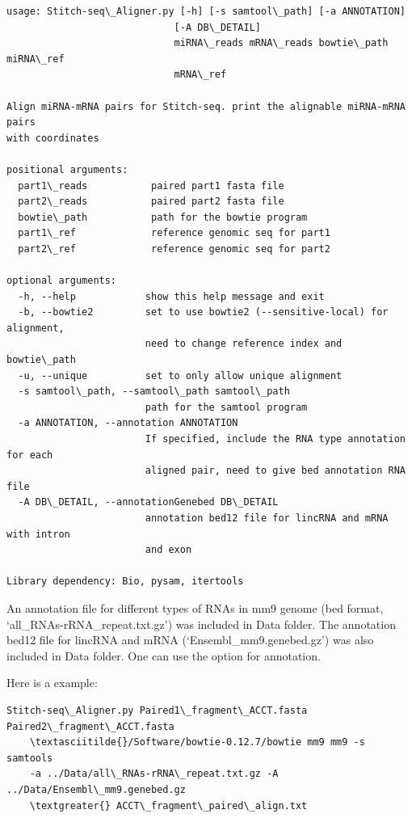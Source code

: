 \documentclass[letterpaper,10pt,english]{sphinxmanual}
\begin{document}
\begin{Verbatim}[commandchars=\\\{\}]
usage: Stitch-seq\_Aligner.py [-h] [-s samtool\_path] [-a ANNOTATION]
                             [-A DB\_DETAIL]
                             miRNA\_reads mRNA\_reads bowtie\_path miRNA\_ref
                             mRNA\_ref

Align miRNA-mRNA pairs for Stitch-seq. print the alignable miRNA-mRNA pairs
with coordinates

positional arguments:
  part1\_reads           paired part1 fasta file
  part2\_reads           paired part2 fasta file
  bowtie\_path           path for the bowtie program
  part1\_ref             reference genomic seq for part1
  part2\_ref             reference genomic seq for part2

optional arguments:
  -h, --help            show this help message and exit
  -b, --bowtie2         set to use bowtie2 (--sensitive-local) for alignment,
                        need to change reference index and bowtie\_path
  -u, --unique          set to only allow unique alignment
  -s samtool\_path, --samtool\_path samtool\_path
                        path for the samtool program
  -a ANNOTATION, --annotation ANNOTATION
                        If specified, include the RNA type annotation for each
                        aligned pair, need to give bed annotation RNA file
  -A DB\_DETAIL, --annotationGenebed DB\_DETAIL
                        annotation bed12 file for lincRNA and mRNA with intron
                        and exon

Library dependency: Bio, pysam, itertools
\end{Verbatim}

An annotation file for different types of RNAs in mm9 genome (bed format, `all\_RNAs-rRNA\_repeat.txt.gz') was included in Data folder. The annotation bed12 file for lincRNA and mRNA (`Ensembl\_mm9.genebed.gz') was also included in Data folder. One can use the option  for annotation.

Here is a example:

\begin{Verbatim}[commandchars=\\\{\}]
Stitch-seq\_Aligner.py Paired1\_fragment\_ACCT.fasta Paired2\_fragment\_ACCT.fasta
    \textasciitilde{}/Software/bowtie-0.12.7/bowtie mm9 mm9 -s samtools
    -a ../Data/all\_RNAs-rRNA\_repeat.txt.gz -A ../Data/Ensembl\_mm9.genebed.gz
    \textgreater{} ACCT\_fragment\_paired\_align.txt
\end{Verbatim}
\end{document}
